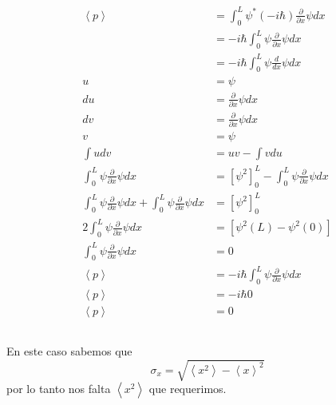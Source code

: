 \documentclass{report}
\begin{document}
\subsection{}

\begin{align*}
  \left< p \right> &= \int_0^L \psi^* (-i \hbar) \frac{\partial }{\partial x} \psi dx \\
  &= -i \hbar\int_0^L \psi \frac{\partial }{\partial x} \psi dx \\
  &= -i \hbar\int_0^L \psi \frac{d }{dx} \psi dx \\
  u &= \psi\\
  du &= \frac{\partial}{\partial x} \psi dx\\
  dv &= \frac{\partial}{\partial x} \psi dx\\
  v &= \psi\\
  \int udv &= uv - \int vdu\\
  \int_0^L \psi \frac{\partial }{\partial x} \psi dx &= \left[\psi^2\right]_0^L - \int_0^L \psi \frac{\partial}{\partial x}\psi dx\\
  \int_0^L \psi \frac{\partial }{\partial x} \psi dx + \int_0^L \psi \frac{\partial}{\partial x}\psi dx &= \left[\psi^2\right]_0^L\\
  2 \int_0^L \psi \frac{\partial }{\partial x} \psi dx &= \left[\psi^2(L) - \psi^2(0)\right]\\
  \int_0^L \psi \frac{\partial }{\partial x} \psi dx &= 0\\
  \left< p \right> &= -i \hbar\int_0^L \psi \frac{\partial }{\partial x} \psi dx \\
  \left< p \right> &= -i \hbar 0\\
  \left< p \right> &= 0
\end{align*}

\subsection{}

En este caso sabemos que \[\sigma_x = \sqrt{\left<x^2\right> - \left<x\right>^2}\] por lo tanto nos falta $\left< x^2 \right>$ que requerimos.
\end{document}
